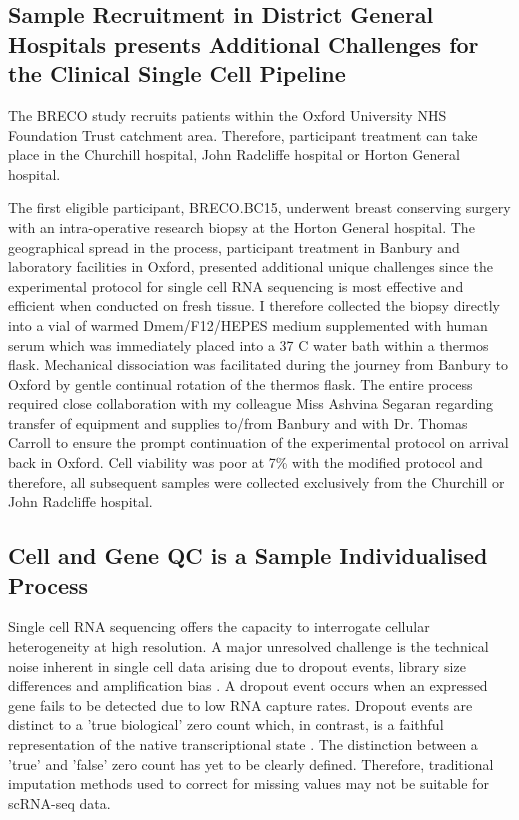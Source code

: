 \subsection{Sample Recruitment in District General Hospitals presents Additional Challenges for the Clinical Single Cell Pipeline}

The BRECO study recruits patients within the Oxford University NHS Foundation Trust catchment area. Therefore, participant treatment can take place in the Churchill hospital, John Radcliffe hospital or Horton General hospital.

The first eligible participant, BRECO.BC15, underwent breast conserving surgery with an intra-operative research biopsy at the Horton General hospital. The geographical spread in the process, participant treatment in Banbury and laboratory facilities in Oxford, presented additional unique challenges since the experimental protocol for single cell RNA sequencing is most effective and efficient when conducted on fresh tissue. I therefore collected the biopsy directly into a vial of warmed Dmem/F12/HEPES medium supplemented with human serum which was immediately placed into a 37 \textdegree{}C water bath within a thermos flask. Mechanical dissociation was facilitated during the journey from Banbury to Oxford by gentle continual rotation of the thermos flask. The entire process required close collaboration with my colleague Miss Ashvina Segaran regarding transfer of equipment and supplies to/from Banbury and with Dr. Thomas Carroll to ensure the prompt continuation of the experimental protocol on arrival back in Oxford. Cell viability was poor at 7\% with the modified protocol and therefore, all subsequent samples were collected exclusively from the Churchill or John Radcliffe hospital.

\subsection{Cell and Gene QC is a Sample Individualised Process}
Single cell RNA sequencing offers the capacity to interrogate cellular heterogeneity at high resolution. A major unresolved challenge is the technical noise inherent in single cell data arising due to dropout events, library size differences and amplification bias \cite{Eraslan2019}. A dropout event occurs when an expressed gene fails to be detected due to low RNA capture rates. Dropout events are distinct to a 'true biological' zero count which, in contrast, is a faithful representation of the native transcriptional state \cite{Eraslan2019}. The distinction between a 'true' and 'false' zero count has yet to be clearly defined. Therefore, traditional imputation methods used to correct for missing values may not be suitable for scRNA-seq data.

